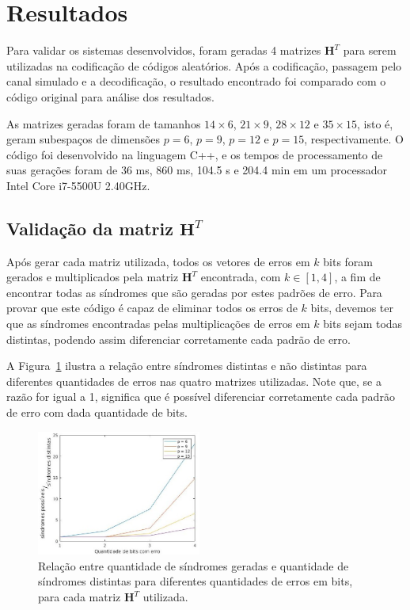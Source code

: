 \section{Resultados}
Para validar os sistemas desenvolvidos, foram geradas 4 matrizes $\textbf{H}^T$ para serem utilizadas na codificação de códigos aleatórios. Após a codificação, passagem pelo canal simulado e a decodificação, o resultado encontrado foi comparado com o código original para análise dos resultados.

As matrizes geradas foram de tamanhos $14 \times 6$, $21 \times 9$, $28 \times 12$ e $35 \times 15$, isto é, geram subespaços de dimensões $p = 6$, $p = 9$, $p = 12$ e $p = 15$, respectivamente. O código foi desenvolvido na linguagem C++, e os tempos de processamento de suas gerações foram de 36 ms, 860 ms, 104.5 s e 204.4 min em um processador Intel Core i7-5500U 2.40GHz.

\subsection{Validação da matriz $\textbf{H}^T$}

Após gerar cada matriz utilizada, todos os vetores de erros em $k$ bits foram gerados e multiplicados pela matriz $\textbf{H}^T$ encontrada, com $k \in [1,4]$, a fim de encontrar todas as síndromes que são geradas por estes padrões de erro. Para provar que este código é capaz de eliminar todos os erros de $k$ bits, devemos ter que as síndromes encontradas pelas multiplicações de erros em $k$ bits sejam todas distintas, podendo assim diferenciar corretamente cada padrão de erro.

A Figura~\ref{fig:sindromes} ilustra a relação entre síndromes distintas e não distintas para diferentes quantidades de erros nas quatro matrizes utilizadas. Note que, se a razão for igual a 1, significa que é possível diferenciar corretamente cada padrão de erro com dada quantidade de bits.

\begin{figure}[thpb]
  \centering
  \includegraphics[width=0.48\textwidth]{sections/sindromes_comparison.jpg}
  \caption{Relação entre quantidade de síndromes geradas e quantidade de síndromes distintas para diferentes quantidades de erros em bits, para cada matriz $\textbf{H}^T$ utilizada.}
  \label{fig:sindromes}
\end{figure}

